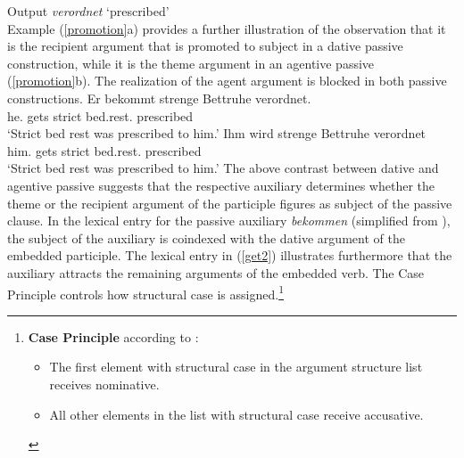 \documentclass[output=paper
                ,modfonts
                ,nonflat
	        ,collection
	        ,collectionchapter
	        ,collectiontoclongg
 	        ,biblatex
                ,babelshorthands
                ,newtxmath
                ,draftmode
                ,colorlinks, citecolor=brown
]{./langsci/langscibook}
\begin{document}
\ea \label{passive}
Output \textit{verordnet} `prescribed' \\
\z 
Example (\ref{promotion}a) provides a further illustration of the observation that it is the recipient argument that is promoted to subject in a dative passive construction, while it is the theme argument in an agentive passive (\ref{promotion}b). The realization of the agent argument is blocked in both passive constructions. 
\eal \label{promotion}
\ex
\gll Er bekommt strenge Bettruhe verordnet. \\ he.\nom {} gets strict bed.rest.\acc {} prescribed \\
\glt `Strict bed rest was prescribed to him.'
\ex
\gll Ihm wird strenge Bettruhe verordnet \\ him.\dat {} gets strict bed.rest.\nom {} prescribed \\
\glt  `Strict bed rest was prescribed to him.'
\zl
The above contrast between dative and agentive passive suggests that the respective auxiliary determines whether the theme or the recipient argument of the participle figures as subject of the passive clause. In the lexical entry for the passive auxiliary \textit{bekommen} (simplified from \cite[313]{mueller2013}), the subject of the auxiliary is coindexed with the dative argument of the embedded participle. The lexical entry in (\ref{get2}) illustrates furthermore that the auxiliary attracts the remaining arguments of the embedded verb. The Case Principle controls how structural case is assigned.\footnote{\textbf{Case Principle} according to \cite[287]{mueller2018}:
\begin{itemize}
\setlength{\itemsep}{0pt}
\item The first element with structural case in the argument structure list receives nominative.
\item All other elements in the list with structural case receive accusative.
\end{itemize}}
\end{document}
